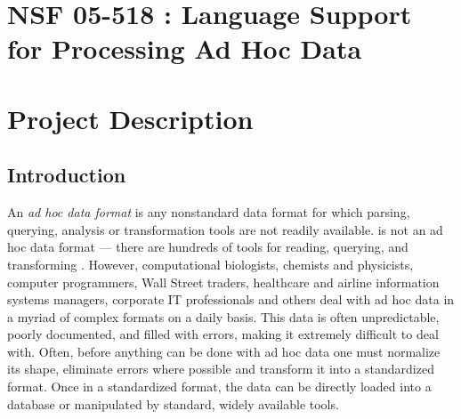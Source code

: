 \documentclass[11pt]{article}
\begin{document}
\setcounter{page}{1}
\appendix
\section{NSF 05-518 \datatype{}: Language Support for Processing Ad Hoc Data}

\newpage
\setcounter{page}{1}
\section{Project Description}

\subsection{Introduction}
\label{ssec:intro}

An {\em ad hoc data format} is any nonstandard data format for which
parsing, querying, analysis or transformation tools are not readily
available.  \xml{} is not an ad hoc data format --- there are hundreds
of tools for reading, querying, and transforming \xml{}.  However,
computational biologists, chemists and physicists, computer programmers,
Wall Street traders, healthcare and airline information systems managers,
corporate IT professionals and 
others deal with ad hoc
data in a myriad of complex formats on a daily basis.
This data is often unpredictable, poorly documented, and
filled with errors, making it extremely difficult
to deal with.  Often, before anything can be done with
ad hoc data one must normalize its shape, eliminate errors
where possible and transform it into a standardized format. 
Once in a standardized format, the data
can be directly loaded into a database or manipulated by
standard, widely available tools.  
\end{document}
